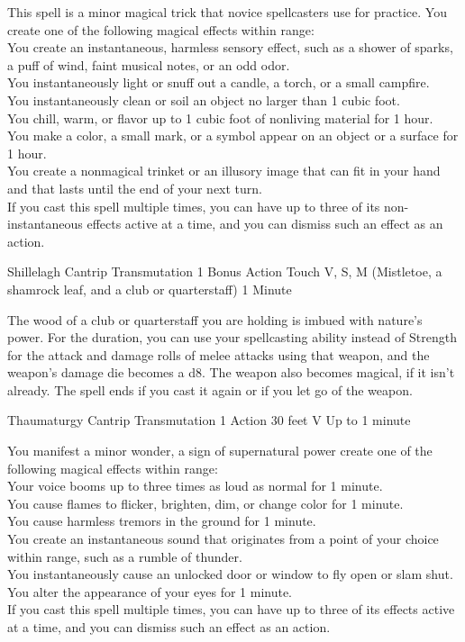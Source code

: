 \documentclass[letterpaper,openany,oneside,twocolumn]{book}
\begin{document}
This spell is a minor magical trick that novice spellcasters use for practice. You create one of the following magical effects within range:\\
You create an instantaneous, harmless sensory effect, such as a shower of sparks, a puff of wind, faint musical notes, or an odd odor.\\
You instantaneously light or snuff out a candle, a torch, or a small campfire.\\
You instantaneously clean or soil an object no larger than 1 cubic foot.\\
You chill, warm, or flavor up to 1 cubic foot of nonliving material for 1 hour.\\
You make a color, a small mark, or a symbol appear on an object or a surface for 1 hour.\\
You create a nonmagical trinket or an illusory image that can fit in your hand and that lasts until the end of your next turn.\\
If you cast this spell multiple times, you can have up to three of its non-instantaneous effects active at a time, and you can dismiss such an effect as an action.

\DndSpellHeader
  {Shillelagh}
  {Cantrip Transmutation}
  {1 Bonus Action}
  {Touch}
  {V, S, M (Mistletoe, a shamrock leaf, and a club or quarterstaff)}
  {1 Minute}
  
The wood of a club or quarterstaff you are holding is imbued with nature's power. For the duration, you can use your spellcasting ability instead of Strength for the attack and damage rolls of melee attacks using that weapon, and the weapon's damage die becomes a d8. The weapon also becomes magical, if it isn't already. The spell ends if you cast it again or if you let go of the weapon.

\DndSpellHeader
  {Thaumaturgy}
  {Cantrip Transmutation}
  {1 Action}
  {30 feet}
  {V}
  {Up to 1 minute}

You manifest a minor wonder, a sign of supernatural power create one of the following magical effects within range:\\
Your voice booms up to three times as loud as normal for 1 minute.\\
You cause flames to flicker, brighten, dim, or change color for 1 minute.\\
You cause harmless tremors in the ground for 1 minute.\\
You create an instantaneous sound that originates from a point of your choice within range, such as a rumble of thunder.\\
You instantaneously cause an unlocked door or window to fly open or slam shut.\\
You alter the appearance of your eyes for 1 minute.\\
If you cast this spell multiple times, you can have up to three of its effects active at a time, and you can dismiss such an effect as an action.\\
\end{document}
